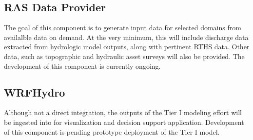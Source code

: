\documentclass[letterpaper,12pt,english,openany,oneside]{sphinxmanual}
\begin{document}
\subsection{RAS Data Provider}
\label{\detokenize{euidev/integrations/index:ras-data-provider}}
\sphinxAtStartPar
The goal of this component is to generate  input data for selected domains from  availalble data on demand.  At the very minimum, this will include discharge data extracted from hydrologic model outputs, along with pertinent RTHS data. Other data, such as topographic and hydraulic asset surveys will also be provided. The development of this component is currently on\sphinxhyphen{}going.


\subsection{WRF\sphinxhyphen{}Hydro}
\label{\detokenize{euidev/integrations/index:wrf-hydro}}
\sphinxAtStartPar
Although not a direct integration, the outputs of the Tier I modeling effort will be ingested into  for visualization and decision support application.  Development of this component is pending prototype deployment of the Tier I model.


\renewcommand{\indexname}{Python Module Index}
\begin{sphinxtheindex}
\let\bigletter\sphinxstyleindexlettergroup
\bigletter{g}
\item\relax{}
\indexspace
\bigletter{r}
\item\relax{}
\item\relax{}
\indexspace
\bigletter{s}
\item\relax{}
\indexspace
\bigletter{w}
\item\relax{}
\end{sphinxtheindex}

\renewcommand{\indexname}{Index}
\printindex
\end{document}

